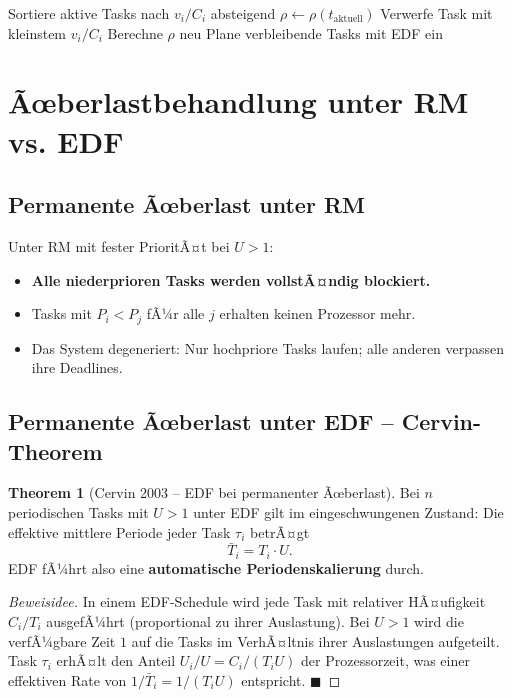 ﻿\documentclass[a4paper,12pt]{report}
\theoremstyle{definition}
\newtheorem{theorem}{Theorem}[chapter]
\begin{document}
\begin{algorithm}[H]
	\caption{Value-Based Scheduling unter Ãœberlast (vereinfacht)}
	\begin{algorithmic}[1]
		\State Sortiere aktive Tasks nach $v_i/C_i$ absteigend
		\State $\rho \leftarrow \rho(t_{\text{aktuell}})$
		\State Verwerfe Task mit kleinstem $v_i/C_i$
		\State Berechne $\rho$ neu
		\EndWhile
		\State Plane verbleibende Tasks mit EDF ein
	\end{algorithmic}
\end{algorithm}

\section{Ãœberlastbehandlung unter RM vs. EDF}

\subsection{Permanente Ãœberlast unter RM}

Unter RM mit fester PrioritÃ¤t bei $U > 1$:
\begin{itemize}
	\item \textbf{Alle niederprioren Tasks werden vollstÃ¤ndig blockiert.}
	\item Tasks mit $P_i < P_j$ fÃ¼r alle $j$ erhalten keinen Prozessor mehr.
	\item Das System degeneriert: Nur hochpriore Tasks laufen; alle anderen
	      verpassen ihre Deadlines.
\end{itemize}

\subsection{Permanente Ãœberlast unter EDF -- Cervin-Theorem}

\begin{theorem}[Cervin 2003 -- EDF bei permanenter Ãœberlast]
	\label{thm:cervin}
	Bei $n$ periodischen Tasks mit $U > 1$ unter EDF gilt im eingeschwungenen
	Zustand: Die effektive mittlere Periode jeder Task $\tau_i$ betrÃ¤gt
	\[
		\bar{T}_i = T_i \cdot U.
	\]
	EDF fÃ¼hrt also eine \textbf{automatische Periodenskalierung} durch.
\end{theorem}

\begin{proof}[Beweisidee]
	In einem EDF-Schedule wird jede Task mit relativer HÃ¤ufigkeit $C_i/T_i$ ausgefÃ¼hrt
	(proportional zu ihrer Auslastung). Bei $U > 1$ wird die verfÃ¼gbare Zeit $1$ auf
	die Tasks im VerhÃ¤ltnis ihrer Auslastungen aufgeteilt. Task $\tau_i$ erhÃ¤lt den
	Anteil $U_i/U = C_i/(T_i U)$ der Prozessorzeit, was einer effektiven Rate von
	$1/\bar{T}_i = 1/(T_i U)$ entspricht. \hfill$\blacksquare$
\end{proof}
\end{document}
